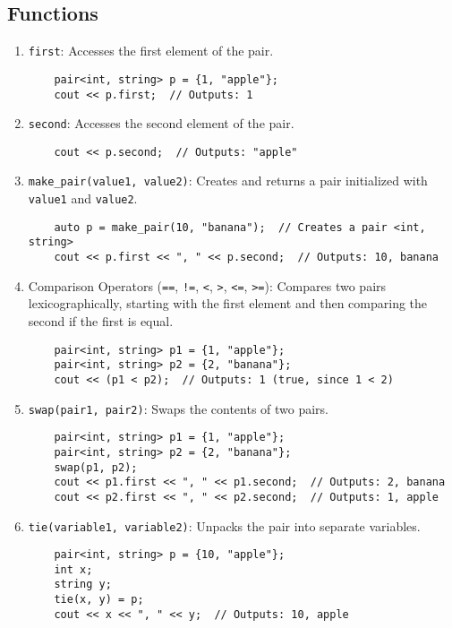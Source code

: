\documentclass{article}
\begin{document}
\subsection{Functions}

\begin{enumerate}
    \item \texttt{first}: Accesses the first element of the pair.
    \begin{lstlisting}
    pair<int, string> p = {1, "apple"};
    cout << p.first;  // Outputs: 1
    \end{lstlisting}
    
    \item \texttt{second}: Accesses the second element of the pair.
    \begin{lstlisting}
    cout << p.second;  // Outputs: "apple"
    \end{lstlisting}

    \item \texttt{make\_pair(value1, value2)}: Creates and returns a pair initialized with \texttt{value1} and \texttt{value2}.
    \begin{lstlisting}
    auto p = make_pair(10, "banana");  // Creates a pair <int, string>
    cout << p.first << ", " << p.second;  // Outputs: 10, banana
    \end{lstlisting}

    \item Comparison Operators (\texttt{==}, \texttt{!=}, \texttt{<}, \texttt{>}, \texttt{<=}, \texttt{>=}): Compares two pairs lexicographically, starting with the first element and then comparing the second if the first is equal.
    \begin{lstlisting}
    pair<int, string> p1 = {1, "apple"};
    pair<int, string> p2 = {2, "banana"};
    cout << (p1 < p2);  // Outputs: 1 (true, since 1 < 2)
    \end{lstlisting}
    
    \item \texttt{swap(pair1, pair2)}: Swaps the contents of two pairs.
    \begin{lstlisting}
    pair<int, string> p1 = {1, "apple"};
    pair<int, string> p2 = {2, "banana"};
    swap(p1, p2);
    cout << p1.first << ", " << p1.second;  // Outputs: 2, banana
    cout << p2.first << ", " << p2.second;  // Outputs: 1, apple
    \end{lstlisting}

    \item \texttt{tie(variable1, variable2)}: Unpacks the pair into separate variables.
    \begin{lstlisting}
    pair<int, string> p = {10, "apple"};
    int x;
    string y;
    tie(x, y) = p;
    cout << x << ", " << y;  // Outputs: 10, apple
    \end{lstlisting}


\end{enumerate}
\end{document}

